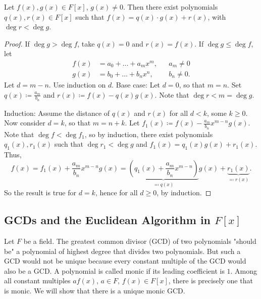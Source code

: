 \documentclass[10pt, a4paper]{article}
\begin{document}
\begin{proposition}
    Let $f(x), g(x) \in F[x]$,
    $g(x) \neq 0$.
    Then there exist polynomials $q(x), r(x) \in F[x]$ such that $f(x) = q(x) \cdot g(x) + r(x)$,
    with $\deg{r} < \deg{g}$.

    \begin{proof}
        If $\deg{g} > \deg{f}$,
        take $q(x) = 0$ and $r(x) = f(x)$.
        If $\deg{g} \leq \deg{f}$,
        let
        \begin{align*}
            f(x) &= a_0 + \dotsc + a_mx ^ m, && a_m \neq 0 \\
            g(x) &= b_0 + \dotsc + b_nx ^ n, && b_n \neq 0.
        \end{align*}
        Let $d = m - n$.
        Use induction on $d$.
        Base case:
        Let $d = 0$,
        so that $m = n$.
        Set $q(x) \coloneqq \frac{a_m}{b_n}$ and $r(x) \coloneqq f(x) - q(x)g(x)$.
        Note that $\deg{r} < m = \deg{g}$.

        Induction:
        Assume the distance of $q(x)$ and $r(x)$ for all $d < k$,
        some $k \geq 0$.
        Now consider $d = k$,
        so that $m = n + k$.
        Let $f_1(x) \coloneqq f(x) - \frac{a_m}{b_n}x ^ {m - n}g(x)$.
        Note that $\deg{f} < \deg{f_1}$,
        so by induction,
        there exist polynomials $q_1(x), r_1(x)$ such that $\deg{r_1} < \deg{g}$ and $f_1(x) = q_1(x)g(x) + r_1(x)$.
        Thus,
        \[
        f(x) = f_1(x) + \frac{a_m}{b_n}x ^ {m - n}g(x) = \underbrace{\left(q_1(x) + \frac{a_m}{b_n}x ^ {m - n}\right)}_{\eqqcolon q(x)}g(x) + \underbrace{r_1(x)}_{\eqqcolon r(x)}.
        \]
        So the result is true for $d = k$,
        hence for all $d \geq 0$,
        by induction.
    \end{proof}
\end{proposition}

\subsection{GCDs and the Euclidean Algorithm in \texorpdfstring{$F[x]$}{}}
Let $F$ be a field.
The greatest common divisor
(GCD)
of two polynomials
"should be"
a polynomial of highest degree that divides two polynomials.
But such a GCD would not be unique because every constant multiple of the GCD would also be a GCD.
A polynomial is called monic if its leading coefficient is $1$.
Among all constant multiples $af(x)$,
$a \in F$,
$f(x) \in F[x]$,
there is precisely one that is monic.
We will show that there is a unique monic GCD.
\end{document}
